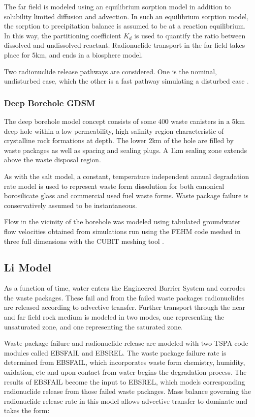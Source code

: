 {The far field is modeled using an equilibrium sorption model in addition 
to solubility limited diffusion and advection. In such an equilibrium sorption 
model, the sorption to precipitation balance is assumed to be at a 
reaction equilibrium. In this way, the partitioning coefficient $K_d$ is used to 
quantify the ratio between dissolved and undissolved reactant. Radionuclide transport
in the far field takes place for 5km, and ends in a biosphere model. 

Two radionuclide release pathways are considered. One is the nominal, undisturbed 
case, which the other is a fast pathway simulating a disturbed case
\cite{clayton_generic_2011}.


\subsubsection{ Deep Borehole GDSM}

The deep borehole model concept consists of some 400 waste canisters in a 5km 
deep hole within a low permeability, high salinity region characteristic of 
crystalline rock formations at depth. The lower 2km of the hole are filled 
by waste packages as well as spacing and sealing plugs. A 1km sealing zone 
extends above the waste disposal region.

As with the salt model, a constant, temperature independent annual degradation
rate model is used to represent waste form dissolution for both canonical 
borosilicate glass and commercial used fuel waste forms. Waste package failure 
is conservatively assumed to be instantaneous.

Flow in the vicinity of the borehole was modeled using tabulated groundwater 
flow velocities obtained from simulations run using the \gls{FEHM} code 
meshed in three full dimensions with the \gls{CUBIT} meshing tool 
\cite{clayton_generic_2011}.

\subsection{Li Model\cite{li_methodology_2006}} As a function of time, water
enters the Engineered Barrier System and corrodes the waste packages.  These
fail and from the failed waste packages radionuclides are released according to
advective transfer.  Further transport through the near and far field rock
medium is modeled in two modes, one representing the unsaturated zone, and one
representing the saturated zone.

Waste package failure and radionuclide release are modeled with two TSPA
code modules called EBSFAIL and EBSREL. The waste package failure rate is
determined from EBSFAIL, which incorporates waste form chemistry, humidity,
oxidation, etc and upon contact from water begins the degradation process. The
results of EBSFAIL become the input to EBSREL, which models corresponding
radionuclide release from those failed waste packages. Mass balance governing the
radionuclide release rate in this model allows advective transfer to dominate and
takes the form:

}
